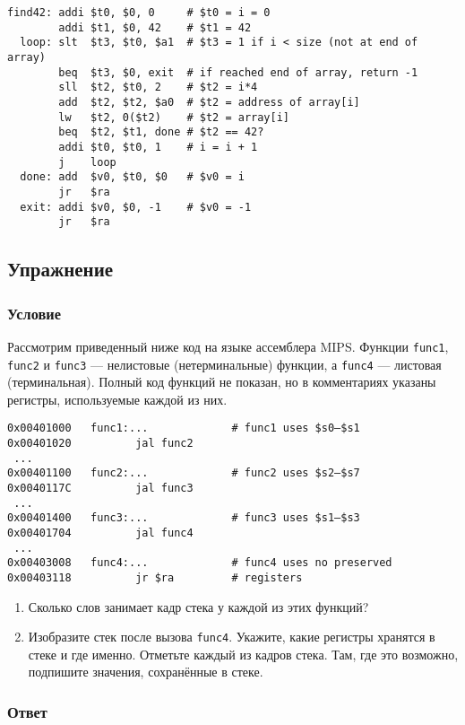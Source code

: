 \documentclass[12pt]{article}
\newenvironment{e}[1][dummy label]{
    \subsection{Упражнение}\label{#1}
    \subsubsection*{Условие}
    }{
    \subsubsection*{Ответ}
}
\begin{document}
    \begin{verbatim}
find42: addi $t0, $0, 0     # $t0 = i = 0
        addi $t1, $0, 42    # $t1 = 42
  loop: slt  $t3, $t0, $a1  # $t3 = 1 if i < size (not at end of array)
        beq  $t3, $0, exit  # if reached end of array, return -1
        sll  $t2, $t0, 2    # $t2 = i*4
        add  $t2, $t2, $a0  # $t2 = address of array[i]
        lw   $t2, 0($t2)    # $t2 = array[i]
        beq  $t2, $t1, done # $t2 == 42?
        addi $t0, $t0, 1    # i = i + 1
        j    loop
  done: add  $v0, $t0, $0   # $v0 = i
        jr   $ra
  exit: addi $v0, $0, -1    # $v0 = -1
        jr   $ra
    \end{verbatim}

    \newpage

    \begin{e}
        Рассмотрим приведенный ниже код на языке ассемблера MIPS. Функции \texttt{func1}, \texttt{func2} и \texttt{func3} --- нелистовые (нетерминальные) функции, а \texttt{func4} --- листовая (терминальная). Полный код функций не показан, но в комментариях указаны регистры, используемые каждой из них.

        \begin{verbatim}
0x00401000   func1:...             # func1 uses $s0–$s1
0x00401020          jal func2
 ...
0x00401100   func2:...             # func2 uses $s2–$s7
0x0040117C          jal func3
 ...
0x00401400   func3:...             # func3 uses $s1–$s3
0x00401704          jal func4
 ...
0x00403008   func4:...             # func4 uses no preserved
0x00403118          jr $ra         # registers
        \end{verbatim}

        \begin{enumerate}
            \item Сколько слов занимает кадр стека у каждой из этих функций?
            \item Изобразите стек после вызова \texttt{func4}. Укажите, какие регистры хранятся в стеке и где именно. Отметьте каждый из кадров стека. Там, где это возможно, подпишите значения, сохранённые в стеке.
        \end{enumerate}
    \end{e}
\end{document}

